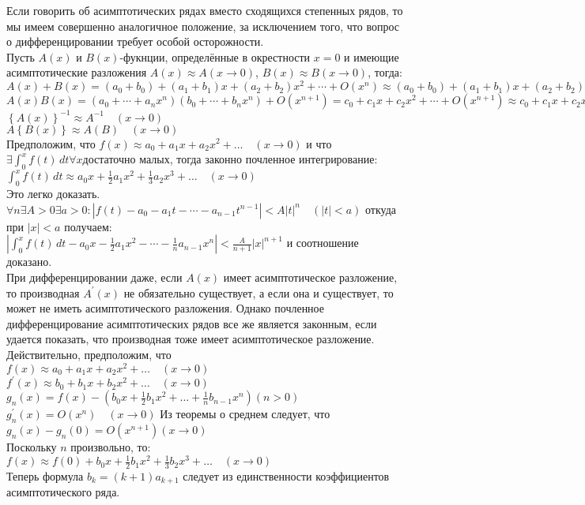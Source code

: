 \documentclass{report}
\begin{document}
Если говорить об асимптотических рядах вместо сходящихся степенных рядов, то мы имеем совершенно аналогичное положение, за исключением того, что вопрос о дифференцировании требует
особой осторожности. \\
Пусть $A(x)$ и $B(x)$-фукнции, определённые в окрестности $x=0$ и имеющие асимптотические разложения $A(x)\approx{A}(x\to{0})$, $B(x)\approx{B}(x\to{0})$, тогда:
$A(x)+B(x) = (a_0+b_0)+(a_1+b_1)x+(a_2+b_2)x^{2}+\cdots+O(x^{n})\approx(a_0+b_0)+(a_1+b_1)x+(a_2+b_2)x^{2}+\cdots = A+B\quad(x\to{0})$ \\
$A(x)B(x)=(a_0+\cdots+a_nx^{n})(b_0+\cdots+b_nx^{n})+O(x^{n+1})=c_0+c_1x+c_2x^{2}+\cdots+O(x^{n+1})\approx c_0+c_1x+c_2x^{2}+\cdots=AB\quad(x\to{0})$ \\
$\left\{A(x)\right\}^{-1}\approx{A^{-1}}\quad(x\to{0})$ \\
$A\left\{B(x)\right\}\approx{A(B)}\quad(x\to{0})$ \\
Предположим, что $f(x)\approx{a_0+a_1x+a_2x^{2}+\dots}\quad(x\to{0})$ и что $\exists{\int_{0}^{x}{f(t)\,dt}}\forall{x \textrm{достаточно малых}}$, тогда законно почленное интегрирование: \\
$\int_{0}^{x}{f(t)\,dt}\approx{a_0x+\frac{1}{2}a_1x^{2}+\frac{1}{3}a_2x^{3}+\dots}\quad(x\to{0})$ \\
Это легко доказать. $\forall{n}\exists{A>0}\exists{a>0}:|f(t)-a_0-a_1t-\cdots-a_{n-1}t^{n-1}|<A|t|^{n}\quad(|t|<a)$ откуда при $|x|<a$ получаем: \\
$\left\vert{\int_{0}^{x}{f(t)\,dt}-a_0x-\frac{1}{2}a_1x^{2}-\cdots-\frac{1}{n}a_{n-1}x^{n}}\right\vert<\frac{A}{n+1}|x|^{n+1}$ и соотношение доказано. \\
При дифференцировании даже, если $A(x)$ имеет асимптотическое разложение, то производная $A^{\prime}(x)$ не обязательно существует, а если она и существует, то может не иметь
асимптотического разложения. Однако почленное дифференцирование асимптотических рядов все же является законным, если удается показать, что производная тоже имеет асимптотическое
разложение. Действительно, предположим, что \\
$f(x)\approx{a_0+a_1x+a_2x^{2}+\dots}\quad(x\to{0})$ \\
$f^{\prime}(x)\approx{b_0+b_1x+b_2x^{2}+\dots}\quad(x\to{0})$ \\
$g_n(x)=f(x)-(b_0x+\frac{1}{2}b_1x^{2}+\dots+\frac{1}{n}b_{n-1}x^{n}) (n>0)$ \\
$g_n^{\prime}(x)=O(x^{n})\quad(x\to{0})$
Из теоремы о среднем следует, что $g_n(x)-g_n(0)=O(x^{n+1})(x\to{0})$ \\
Поскольку $n$ произвольно, то: \\
$f(x)\approx{f(0)+b_0x+\frac{1}{2}b_1x^{2}+\frac{1}{3}b_2x^{3}+\dots}\quad(x\to{0})$ \\
Теперь формула $b_k=(k+1)a_{k+1}$ следует из единственности коэффициентов асимптотического ряда.
\newpage
\end{document}

